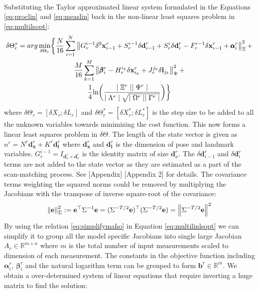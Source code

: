 \paragraph{}
Substituting the Taylor approximated linear system formulated in the Equations \ref{eq:proclin} and \ref{eq:measlin} back in the non-linear least squares problem in \ref{eq:multilsopt}:
\begin{multline}
\delta\Theta^*_r = arg \min_{\delta\Theta_r} \biggl\{ \frac{N}{16} \sum_{i=1}^{N} \left\lVert G^{i-1}_r\delta ^0\textbf{x}^r_{i-1} + S_r^{i-1}\delta \textbf{d}_{i-1}^r + S_r^{i} \delta \textbf{d}_i^r - F_r^{i-1}\delta\textbf{x}_{i-1}^r + \pmb\alpha_i^r\right\rVert_\Xi^2 + \\ \frac{M}{16} \sum_{k=1}^{M} \left\lVert\pmb\beta_i^r - H_r^{i_k}\delta \textbf{x}_{i_k}^r + J_r^{j_k} \delta \textbf{l}_{j_k}\right\rVert_\Psi^2 + \\ \frac{1}{4} \text{ln} \biggl( \frac{\mid \Xi^r \mid \mid \Psi^r \mid}{\mid \Lambda^r \mid \sqrt{\mid \Omega^r \mid \mid \Gamma^r \mid}} \biggr) \biggr\}
\label{eq:multilinlsopt}
\end{multline}
where $\delta\Theta_r = [\delta X_r;\delta L_r]$ and $\delta\Theta^*_r = [\delta X^*_r;\delta L^*_r]$ is the step size to be added to all the unknown variables towards minimizing the cost function. This now forms a linear least squares problem in $\delta\Theta$. The length of the state vector is given as $n^r = N^r\textbf{d}^r_\textbf{x}+K^r\textbf{d}^r_\textbf{l}$ where $\textbf{d}^r_\textbf{x}$ and $\textbf{d}^r_\textbf{l}$ is the dimension of pose and landmark variables. $G^{i-1}_r = I_{\textbf{d}^r_x\times\textbf{d}^r_x}$ is the identity matrix of size $\textbf{d}^r_x$. The $\delta\textbf{d}^r_{i-1}$ and $\delta\textbf{d}^r_{i}$ terms are not added to the state vector as they are estimated as a part of the scan-matching process. See [Appendix] [Appendix 2] for details. The covariance terms weighting the squared norms could be removed by multiplying the Jacobians with the transpose of inverse square-root of the covariance:
\begin{equation}
\left\lVert\textbf{e}\right\rVert^2_\Sigma := \textbf{e}^{\top}\Sigma^{-1}\textbf{e} = (\Sigma^{-T/2}\textbf{e})^{\top}(\Sigma^{-T/2}\textbf{e}) = \left\lVert\Sigma^{-T/2}\textbf{e}\right\rVert^2
\label{eq:simplifymaho}
\end{equation}
By using the relation \ref{eq:simplifymaho} in Equation \ref{eq:multilinlsopt} we can simplify it to group all the model specific Jacobians into single large Jacobian $A_r\in\mathbb{R}^{m\times n}$ where $m$ is the total number of input measurements scaled to dimension of each measurement. The constants in the objective function including $\pmb\alpha_i^r$, $\pmb\beta_i^r$ and the  natural logarithm term can be grouped to form $\textbf{b}^r \in \mathbb{R}^m$. We obtain a over-determined system of linear equations that require inverting a huge matrix to find the solution:
